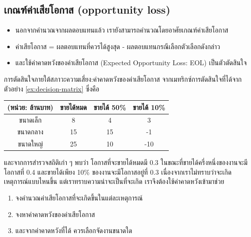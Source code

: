 \subsection{เกณฑ์ค่าเสียโอกาส (opportunity loss)}
\begin{itemize}
    \item นอกจากคำนวณจากผลตอบแทนแล้ว เรายังสามารถคำนวณโดยอาศัยเกณฑ์ค่าเสียโอกาส
    \item ค่าเสียโอกาส = ผลตอบแทนที่ควรได้สูงสุด - ผลตอบแทนกรณีเลือกตัวเลือกดังกล่าว
    \item และใช้ค่าคาดหวังของค่าเสียโอกาส (Expected Opportunity Loss: EOL) เป็นตัวตัดสินใจ
\end{itemize}
\begin{example}
    {การตัดสินใจภายใต้สภาวะความเสี่ยง:ค่าคาดหวังของค่าเสียโอกาส}{}
    จากเมทริกซ์การตัดสินใจที่ได้จากตัวอย่าง \ref{ex:decision-matrix} ซึ่งคือ
    \begin{center}
        \begin{tabular}{|c|c|c|c|}
        \hline
            (หน่วย: ล้านบาท) & ขายได้หมด & ขายได้ 50\% & ขายได้ 10\% \\ \hline
            ขนาดเล็ก & 8 & 4 & 3 \\
            ขนาดกลาง & 15 & 15 & -1\\
            ขนาดใหญ่ & 25 & 10 & -10\\ \hline
        \end{tabular}
    \end{center}
    และจากการสำรวจสถิติเก่า ๆ พบว่า โอกาสที่จะขายได้หมดมี 0.3 ในขณะที่ขายได้ครึ่งหนึ่งของงานจะมีโอกาสที่ 0.4 และขายได้เพียง 10\% ของงานจะมีโอกาสอยู่ที่ 0.3
    เนื่องจากเราไม่ทราบว่าจะเกิดเหตุการณ์แบบไหนขึ้น แต่เราทราบความน่าจะเป็นที่จะเกิด เราจึงต้องใช้ค่าคาดหวังเข้ามาช่วย 
    \begin{enumerate}
        \item จงคำนวณค่าเสียโอกาสที่จะเกิดขึ้นในแต่ละเหตุการณ์
        \item จงหาค่าคาดหวังของค่าเสียโอกาส
        \item และจากค่าคาดหวังที่ได้ ควรเลือกจัดงานขนาดใด
    \end{enumerate}
\end{example}
\newpage
